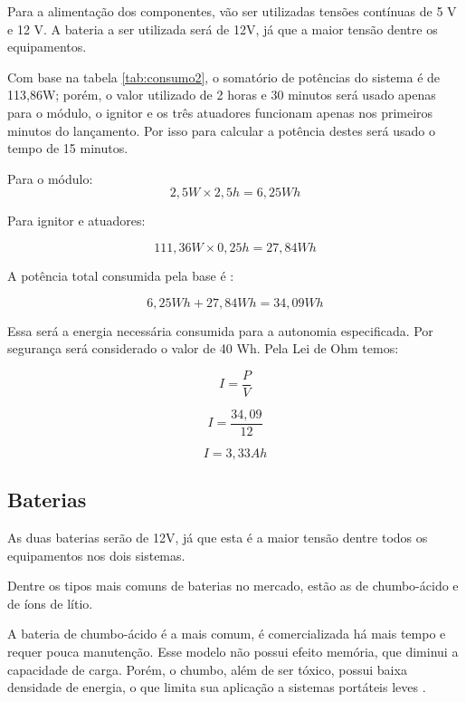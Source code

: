 Para a alimentação dos componentes, vão ser utilizadas tensões contínuas de 5 V e 12 V. A bateria a ser utilizada será de 12V, já que a maior tensão dentre os equipamentos.

Com base na tabela \ref{tab:consumo2}, o somatório de potências do sistema é de 113,86W; porém, o valor utilizado de 2 horas e 30 minutos será usado apenas para o módulo, o ignitor e os três atuadores funcionam apenas nos primeiros minutos do lançamento. Por isso para calcular a potência destes será usado o tempo de 15 minutos.

Para o módulo:
\begin{equation}
    2,5W \times 2,5h = 6,25 Wh
\end{equation}

Para ignitor e atuadores:

\begin{equation}
    111,36W \times 0,25h = 27,84 Wh
\end{equation}

A potência total consumida pela base é :

\begin{equation}
    6,25Wh + 27,84Wh = 34,09 Wh
\end{equation}

Essa será a energia necessária consumida para a autonomia especificada. Por segurança será considerado o valor de 40 Wh.
Pela Lei de Ohm temos:

\begin{equation}
   I =  \frac{P}{V}
   \end{equation}
   
   \begin{equation}
      I =  \frac{34,09}{12}
   \end{equation}
   
  \begin{equation}   
   I = 3,33 Ah
 \end{equation}

\subsection{Baterias}

As duas baterias serão de 12V, já que esta é a maior tensão dentre todos os equipamentos nos dois sistemas.

Dentre os tipos mais comuns de baterias no mercado, estão as de chumbo-ácido e de íons de lítio. 

A bateria de chumbo-ácido é a mais comum, é comercializada há mais tempo e requer pouca manutenção. Esse modelo não possui efeito memória, que diminui a capacidade de carga. Porém, o chumbo, além de ser tóxico, possui baixa densidade de energia,  o que limita sua aplicação a sistemas portáteis leves \cite{baterias}.

